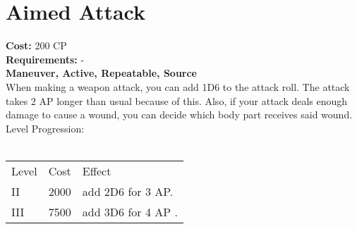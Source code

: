 \section{Aimed Attack}
\textbf{Cost:} 200 CP\\
\textbf{Requirements:} -\\
\textbf{Maneuver, Active, Repeatable, Source}\\
When making a weapon attack, you can add 1D6 to the attack roll. The attack takes 2 AP longer than usual because of this. Also, if your attack deals enough damage to cause a wound, you can decide which body part receives said wound.
\\
Level Progression:\\
\\
\begin{tabular}{l | l | l}
	Level & Cost & Effect\\
	II & 2000 & add 2D6 for 3 AP.\\
	III & 7500 & add 3D6 for 4 AP .\\
\end{tabular}